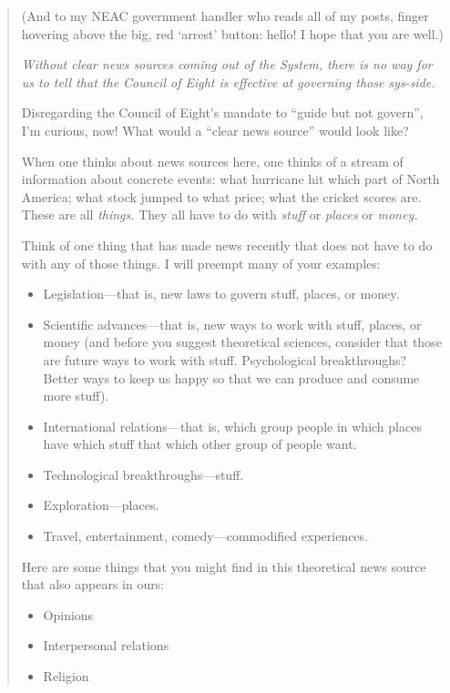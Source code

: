 \begin{quote}
(And to my NEAC government handler who reads all of my posts, finger hovering above the big, red `arrest' button: hello! I hope that you are well.)

\emph{Without clear news sources coming out of the System, there is no way for us to tell that the Council of Eight is effective at governing those sys-side.}

Disregarding the Council of Eight's mandate to ``guide but not govern'', I'm curious, now! What would a ``clear news source'' would look like?

When one thinks about news sources here, one thinks of a stream of information about concrete events: what hurricane hit which part of North America; what stock jumped to what price; what the cricket scores are. These are all \emph{things.} They all have to do with \emph{stuff} or \emph{places} or \emph{money.}

Think of one thing that has made news recently that does not have to do with any of those things. I will preempt many of your examples:

\vspace{-0.25em}

\begin{itemize}
\tightlist
\item
  Legislation---that is, new laws to govern stuff, places, or money.
\item
  Scientific advances---that is, new ways to work with stuff, places, or money (and before you suggest theoretical sciences, consider that those are future ways to work with stuff. Psychological breakthroughs? Better ways to keep us happy so that we can produce and consume more stuff).
\item
  International relations---that is, which group people in which places have which stuff that which other group of people want.
\item
  Technological breakthroughs---stuff.
\item
  Exploration---places.
\item
  Travel, entertainment, comedy---commodified experiences.
\end{itemize}

\vspace{-0.25em}

Here are some things that you might find in this theoretical news source that also appears in ours:

\vspace{-0.25em}

\begin{itemize}
\tightlist
\item
  Opinions
\item
  Interpersonal relations
\item
  Religion
\end{itemize}


\end{quote}
